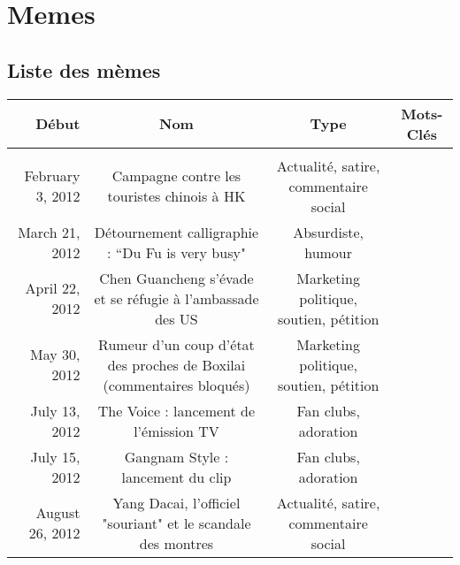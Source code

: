 \chapter[Memes]{Memes}

\section[Liste des mèmes]{Liste des mèmes}

\begin{table}[ht!]
    \begin{minipage}{22cm}
        \begin{turn}{90}
    \begin{tabulary}{\linewidth}{ r| C C C}

        \textbf{Début} & 
        \textbf{Nom} &  
        \textbf{Type} &  
        \textbf{Mots-Clés} \\

        \hline \\[-1.2ex]
        February 3, 2012 & 
        Campagne contre les touristes chinois à HK & 
        Actualité, satire, commentaire social &
         \\

        March 21, 2012 &
        Détournement calligraphie : “Du Fu is very busy" &
        Absurdiste, humour &
         \\

        April 22, 2012 &
        Chen Guancheng s'évade et se réfugie à l'ambassade des US &
        Marketing politique, soutien, pétition &
         \\

        May 30, 2012 & 
        Rumeur d'un coup d'état des proches de Boxilai (commentaires bloqués) &
        Marketing politique, soutien, pétition & 
         \\

        July 13, 2012 &  
        The Voice : lancement de l'émission TV &
         Fan clubs, adoration & 
         \\

        July 15, 2012 &  
        Gangnam Style : lancement du clip &  
        Fan clubs, adoration  &  
         \\

        August 26, 2012 &
        Yang Dacai, l'officiel "souriant" et le scandale des montres &   
        Actualité, satire, commentaire social &  
         \\


\end{tabulary}
\end{turn}
\end{minipage}
\end{table}
